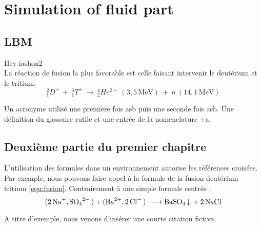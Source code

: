 \chapter{Simulation of fluid part}
\chaptertoc{}

\section{LBM}

	Hey iashon2
	\\ %
	La réaction de fusion la plus favorable est celle faisant intervenir le deutérium et le tritium:
	\begin{equation}
		_{1}^{2}D^{+}~+~_{1}^{3}T^{+}~\rightarrow ~_{2}^{4}He^{2+}~(3,5\,\textrm{MeV})~+~n~(14,1\,\textrm{MeV})
	    \label{equ:fusion}
	\end{equation}

	\noindent %
	\lipsum[2]
	Un acronyme utilisé une première fois \gls{asb} puis une seconde fois \gls{asb}. Une définition du glossaire \gls{rutile} et une entrée de la nomenclature \gls{+a}.

\section{Deuxième partie du premier chapitre}

	\lipsum[2]

	L'utilisation des formules dans un environnement autorise les références croisées. Par exemple, nous pouvons faire appel à la formule de la fusion deutérium-tritium \ref{equ:fusion}. Contrairement à une simple formule centrée :
	$$\ce{(2Na+,SO4^2- ) + (Ba^2+, 2Cl- ) -> BaSO4 v + 2NaCl}$$

	\lipsum[9]

	\begin{displayquote}
	\lipsum[10]
	\end{displayquote}

	A titre d'exemple, nous venons d'insérer une courte citation fictive.